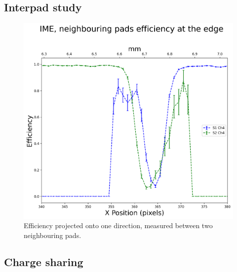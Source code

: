 \subsection{Interpad study}\label{sec:neighbouring_pads}
\begin{figure}[h!tbp]
    \centering
    \includegraphics[width=0.5\linewidth]{Images/detailed_analysis/batch 401 duts:3 and 3, edge efficiency studies.png}
    \captionsetup{width=\captionwidth}
    \caption{Efficiency projected onto one direction, measured between two neighbouring pads.}
    \label{fig:neighbouring_pads}
\end{figure}


\subsection{Charge sharing}

